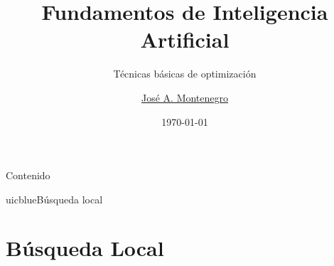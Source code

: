 \documentclass[xcolor=table]{beamer}
\title{Fundamentos de Inteligencia Artificial}
\subtitle{Técnicas básicas de optimización}
\author{\href{mailto:jmmontes@uma.es}{José A. Montenegro}}
\date{\today}
\begin{document}
\newtheorem{mydef}{Definición}[section] %
\maketitle






\begin{frame}{Contenido}
\tableofcontents
\end{frame}


\begin{chapter}{uicblue}{Búsqueda local}
\end{chapter}




\section{Búsqueda Local}

\end{document}
